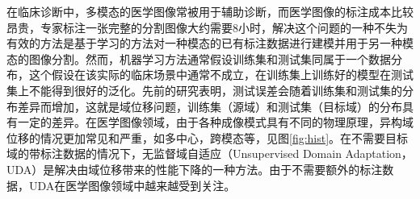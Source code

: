 在临床诊断中，多模态的医学图像常被用于辅助诊断，而医学图像的标注成本比较昂贵，专家标注一张完整的分割图像大约需要8小时\cite{zhuang2013challenges}，解决这个问题的一种不失为有效的方法是基于学习的方法对一种模态的已有标注数据进行建模并用于另一种模态的图像分割。然而，机器学习方法通常假设训练集和测试集同属于一个数据分布，这个假设在该实际的临床场景中通常不成立，在训练集上训练好的模型在测试集上不能得到很好的泛化。先前的研究表明，测试误差会随着训练集和测试集的分布差异而增加\cite{ben2007analysis}，这就是域位移问题，训练集（源域）和测试集（目标域）的分布具有一定的差异。在医学图像领域，由于各种成像模式具有不同的物理原理，异构域位移的情况更加常见和严重，如多中心，跨模态等，见图\ref{fig:hist}。在不需要目标域的带标注数据的情况下，无监督域自适应（Unsupervised Domain Adaptation，UDA）是解决由域位移带来的性能下降的一种方法。由于不需要额外的标注数据，UDA在医学图像领域中越来越受到关注。

